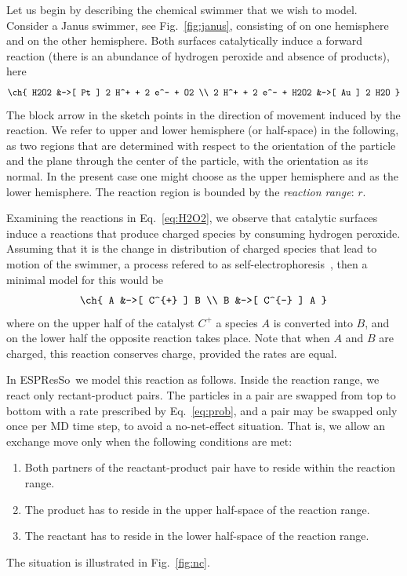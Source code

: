 \documentclass[aip,jcp,reprint,a4paper,onecolumn,nofootinbib,amsmath,amssymb]{revtex4-1}
\newcommand{\es}{\mbox{\textsf{ESPResSo}}\xspace}
\begin{document}
Let us begin by describing the chemical swimmer that we wish to model. Consider a Janus swimmer, see Fig.~\ref{fig:janus}, consisting of  on one hemisphere and  on the other hemisphere. Both surfaces catalytically induce a forward reaction (there is an abundance of hydrogen peroxide and absence of products), here~\cite{Gibbs_10,Wheat_10}
\begin{align}
  \label{eq:H2O2}
  \ch{
    H2O2 &->[ Pt ] 2 H^+ + 2 e^- + O2 \\
    2 H^+ + 2 e^- + H2O2 &->[ Au ] 2 H2O
  }
\end{align}
The block arrow in the sketch points in the direction of movement induced by the reaction. We refer to upper and lower hemisphere (or half-space) in the following, as two regions that are determined with respect to the orientation of the particle and the plane through the center of the particle, with the orientation as its normal. In the present case one might choose  as the upper hemisphere and  as the lower hemisphere. The reaction region is bounded by the \textit{reaction range}: $r$.

Examining the reactions in Eq.~\eqref{eq:H2O2}, we observe that catalytic surfaces induce a reactions that produce charged species by consuming hydrogen peroxide. Assuming that it is the change in distribution of charged species that lead to motion of the swimmer, a process refered to as self-electrophoresis~\cite{Gibbs_10,Wheat_10}, then a minimal model for this would be 
\begin{align}
  \label{eq:simple}
  \ch{
    A &->[ C^{+} ] B \\
    B &->[ C^{-} ] A 
  }
\end{align}
where on the upper half of the catalyst $C^{+}$ a species $A$ is converted into $B$, and on the lower half the opposite reaction takes place. Note that when $A$ and $B$ are charged, this reaction conserves charge, provided the rates are equal. 

In \es\, we model this reaction as follows. Inside the reaction range, we react only rectant-product pairs. The particles in a pair are swapped from top to bottom with a rate prescribed by Eq.~\eqref{eq:prob}, and a pair may be swapped only once per MD time step, to avoid a no-net-effect situation. That is, we allow an exchange move only when the following conditions are met:
\begin{enumerate}
\item Both partners of the reactant-product pair have to reside within
  the reaction range.
\item The product has to reside in the upper half-space of the
  reaction range.
\item The reactant has to reside in the lower half-space of the
  reaction range.
\end{enumerate}
The situation is illustrated in Fig.~\ref{fig:nc}.
\end{document}
